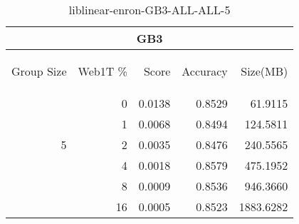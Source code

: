 \begin{center}
\begin{table}[htbp] 
 \begin{center}
\begin{tabular}{ | r | r | r | r | r |}
\hline
\multicolumn{5}{|c|}{GB3}\\
\hline
\begin{sideways}Group Size\end{sideways} & \begin{sideways}Web1T \%\end{sideways} & \begin{sideways}Score\end{sideways} & \begin{sideways}Accuracy\end{sideways} & \begin{sideways}Size(MB)\end{sideways}\\
\hline
\multirow{5}{*}{5}
 & 0 & 0.0138 & 0.8529 & 61.9115\\ \cline{2-5}
 & 1 & 0.0068 & 0.8494 & 124.5811\\ \cline{2-5}
 & 2 & 0.0035 & 0.8476 & 240.5565\\ \cline{2-5}
 & 4 & 0.0018 & 0.8579 & 475.1952\\ \cline{2-5}
 & 8 & 0.0009 & 0.8536 & 946.3660\\ \cline{2-5}
 & 16 & 0.0005 & 0.8523 & 1883.6282\\ \cline{2-5}
\hline
\end{tabular}
\caption{liblinear-enron-GB3-ALL-ALL-5}
\label{table:liblinear-enron-GB3-ALL-ALL-5}
\end{center}
 \end{table}
\end{center}

